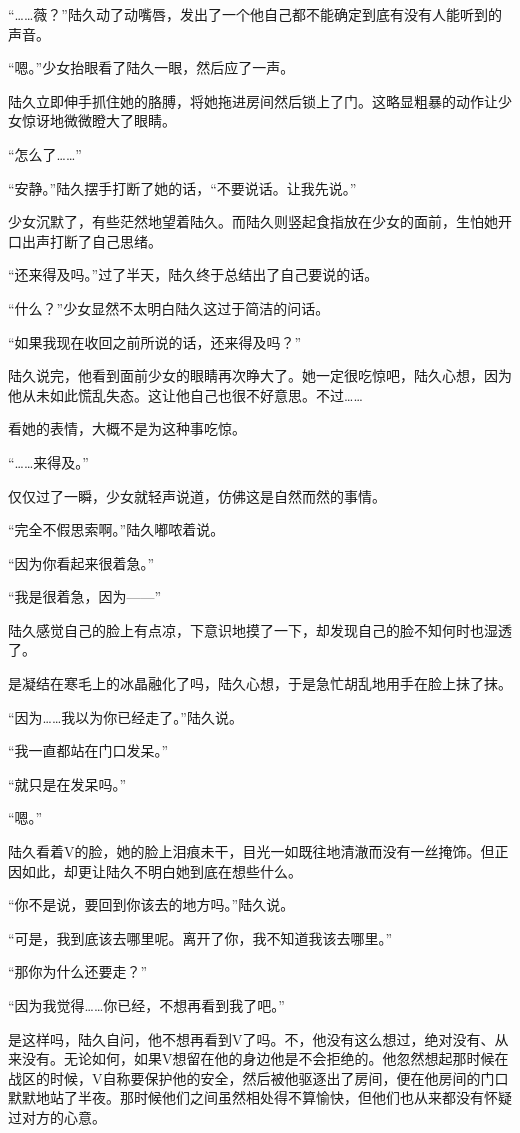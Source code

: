 “……薇？”陆久动了动嘴唇，发出了一个他自己都不能确定到底有没有人能听到的声音。

“嗯。”少女抬眼看了陆久一眼，然后应了一声。

陆久立即伸手抓住她的胳膊，将她拖进房间然后锁上了门。这略显粗暴的动作让少女惊讶地微微瞪大了眼睛。

“怎么了……”

“安静。”陆久摆手打断了她的话，“不要说话。让我先说。”

少女沉默了，有些茫然地望着陆久。而陆久则竖起食指放在少女的面前，生怕她开口出声打断了自己思绪。

“还来得及吗。”过了半天，陆久终于总结出了自己要说的话。

“什么？”少女显然不太明白陆久这过于简洁的问话。

“如果我现在收回之前所说的话，还来得及吗？”

陆久说完，他看到面前少女的眼睛再次睁大了。她一定很吃惊吧，陆久心想，因为他从未如此慌乱失态。这让他自己也很不好意思。不过……

看她的表情，大概不是为这种事吃惊。

“……来得及。”

仅仅过了一瞬，少女就轻声说道，仿佛这是自然而然的事情。

“完全不假思索啊。”陆久嘟哝着说。

“因为你看起来很着急。”

“我是很着急，因为——”

陆久感觉自己的脸上有点凉，下意识地摸了一下，却发现自己的脸不知何时也湿透了。

是凝结在寒毛上的冰晶融化了吗，陆久心想，于是急忙胡乱地用手在脸上抹了抹。

“因为……我以为你已经走了。”陆久说。

“我一直都站在门口发呆。”

“就只是在发呆吗。”

“嗯。”

陆久看着V的脸，她的脸上泪痕未干，目光一如既往地清澈而没有一丝掩饰。但正因如此，却更让陆久不明白她到底在想些什么。

“你不是说，要回到你该去的地方吗。”陆久说。

“可是，我到底该去哪里呢。离开了你，我不知道我该去哪里。”

“那你为什么还要走？”

“因为我觉得……你已经，不想再看到我了吧。”

是这样吗，陆久自问，他不想再看到V了吗。不，他没有这么想过，绝对没有、从来没有。无论如何，如果V想留在他的身边他是不会拒绝的。他忽然想起那时候在战区的时候，V自称要保护他的安全，然后被他驱逐出了房间，便在他房间的门口默默地站了半夜。那时候他们之间虽然相处得不算愉快，但他们也从来都没有怀疑过对方的心意。

